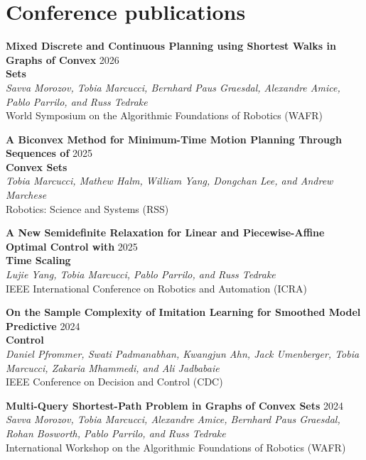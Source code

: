 \documentclass[11pt,a4paper,sans,twoside]{moderncv}
\begin{document}
\section{Conference publications}

\begin{enumerate}[label={[C\arabic*]}]
	
\item \textbf{Mixed Discrete and Continuous Planning using Shortest Walks in Graphs of Convex} \hfill 2026 \\ \textbf{Sets} \\
\textit{Savva Morozov, Tobia Marcucci, Bernhard Paus Graesdal, Alexandre Amice, Pablo Parrilo, and Russ Tedrake} \\
World Symposium on the Algorithmic Foundations of Robotics (WAFR)
	
\item \textbf{A Biconvex Method for Minimum-Time Motion Planning Through Sequences of} \hfill 2025 \\ \textbf{Convex Sets} \\
\textit{Tobia Marcucci, Mathew Halm, William Yang, Dongchan Lee, and Andrew Marchese } \\
Robotics: Science and Systems (RSS)

\item \textbf{A New Semidefinite Relaxation for Linear and Piecewise-Affine Optimal Control with} \hfill 2025 \\ \textbf{Time Scaling} \\
\textit{Lujie Yang, Tobia Marcucci, Pablo Parrilo, and Russ Tedrake} \\
IEEE International Conference on Robotics and Automation (ICRA)
	
\item \textbf{On the Sample Complexity of Imitation Learning for Smoothed Model Predictive} \hfill 2024 \\ \textbf{Control} \\
\textit{Daniel Pfrommer, Swati Padmanabhan, Kwangjun Ahn, Jack Umenberger, Tobia Marcucci, Zakaria Mhammedi, and Ali Jadbabaie} \\
IEEE Conference on Decision and Control (CDC)
	
\item \textbf{Multi-Query Shortest-Path Problem in Graphs of Convex Sets} \hfill 2024 \\
\textit{Savva Morozov, Tobia Marcucci, Alexandre Amice, Bernhard Paus Graesdal,  Rohan Bosworth,  Pablo Parrilo, and Russ Tedrake} \\
International Workshop on the Algorithmic Foundations of Robotics (WAFR)


\end{enumerate}
\end{document}
